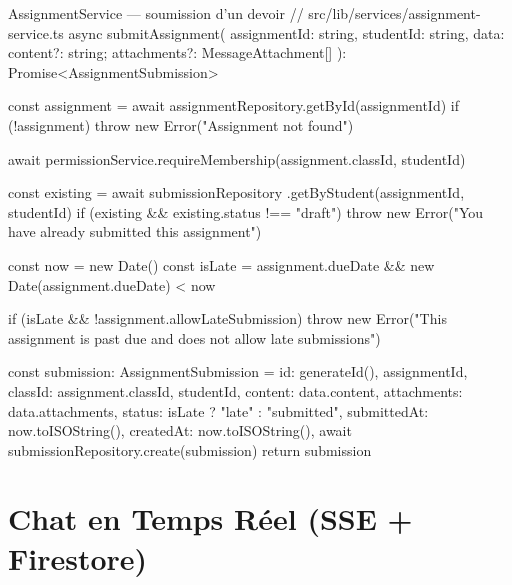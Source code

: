 \documentclass[12pt, a4paper, twoside]{report}
\begin{document}
\begin{codesnap}[TypeScript]{AssignmentService — soumission d'un devoir}
// src/lib/services/assignment-service.ts
async submitAssignment(
  assignmentId: string,
  studentId: string,
  data: { content?: string; attachments?: MessageAttachment[] }
): Promise<AssignmentSubmission> {
  const assignment = await assignmentRepository.getById(assignmentId)
  if (!assignment) throw new Error("Assignment not found")

  await permissionService.requireMembership(assignment.classId, studentId)

  const existing = await submissionRepository
    .getByStudent(assignmentId, studentId)
  if (existing && existing.status !== "draft") {
    throw new Error("You have already submitted this assignment")
  }

  const now = new Date()
  const isLate = assignment.dueDate && new Date(assignment.dueDate) < now

  if (isLate && !assignment.allowLateSubmission) {
    throw new Error("This assignment is past due and does not allow late submissions")
  }

  const submission: AssignmentSubmission = {
    id: generateId(),
    assignmentId,
    classId: assignment.classId,
    studentId,
    content: data.content,
    attachments: data.attachments,
    status: isLate ? "late" : "submitted",
    submittedAt: now.toISOString(),
    createdAt: now.toISOString(),
  }
  await submissionRepository.create(submission)
  return submission
}
\end{codesnap}

\section{Chat en Temps Réel (SSE + Firestore)}
\end{document}
